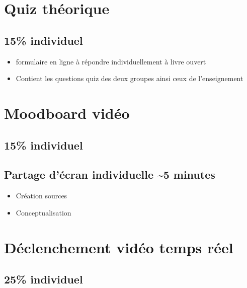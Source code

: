 \documentclass[
]{book}
\providecommand{\tightlist}{%
  \setlength{\itemsep}{0pt}\setlength{\parskip}{0pt}}
\begin{document}
\hypertarget{evaluation_3}{%
\section{Quiz théorique}\label{evaluation_3}}

\hypertarget{individuel-2}{%
\subsection{15\% individuel}\label{individuel-2}}

\begin{itemize}
\tightlist
\item
  formulaire en ligne à répondre individuellement à livre ouvert
\item
  Contient les questions quiz des deux groupes ainsi ceux de l'enseignement
\end{itemize}

\hypertarget{evaluation_4}{%
\section{Moodboard vidéo}\label{evaluation_4}}

\hypertarget{individuel-3}{%
\subsection{15\% individuel}\label{individuel-3}}

\hypertarget{partage-duxe9cran-individuelle-5-minutes}{%
\subsection{Partage d'écran individuelle \textasciitilde5 minutes}\label{partage-duxe9cran-individuelle-5-minutes}}

\begin{itemize}
\tightlist
\item
  Création sources
\item
  Conceptualisation
\end{itemize}

\hypertarget{evaluation_5}{%
\section{Déclenchement vidéo temps réel}\label{evaluation_5}}

\hypertarget{individuel-4}{%
\subsection{25\% individuel}\label{individuel-4}}
\end{document}
